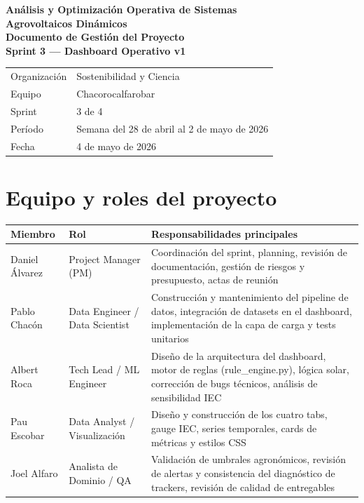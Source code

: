 \documentclass[11pt,a4paper]{article}
\begin{document}
\thispagestyle{empty}

\vspace*{2cm}
\begin{center}
  {\LARGE \textbf{Análisis y Optimización Operativa de Sistemas}}\\[0.3em]
  {\LARGE \textbf{Agrovoltaicos Dinámicos}}\\[2em]
  {\large \textbf{Documento de Gestión del Proyecto}}\\[0.5em]
  {\large \textbf{Sprint 3 — Dashboard Operativo v1}}\\[3em]

  \begin{longtable}{p{} p{}}
    Organización & Sostenibilidad y Ciencia \\
    Equipo       & Chacorocalfarobar \\
    Sprint       & 3 de 4 \\
    Período      & Semana del 28 de abril al 2 de mayo de 2026 \\
    Fecha        & 4 de mayo de 2026 \\
  \end{longtable}
\end{center}

\newpage

\tableofcontents
\newpage

\section{Equipo y roles del proyecto}

\begin{longtable}{p{} p{} p{}}
\textbf{Miembro} & \textbf{Rol} & \textbf{Responsabilidades principales} \\
\hline
Daniel Álvarez & Project Manager (PM) & Coordinación del sprint, planning, revisión de documentación, gestión de riesgos y presupuesto, actas de reunión \\
Pablo Chacón   & Data Engineer / Data Scientist & Construcción y mantenimiento del pipeline de datos, integración de datasets en el dashboard, implementación de la capa de carga y tests unitarios \\
Albert Roca    & Tech Lead / ML Engineer & Diseño de la arquitectura del dashboard, motor de reglas (rule\_engine.py), lógica solar, corrección de bugs técnicos, análisis de sensibilidad IEC \\
Pau Escobar    & Data Analyst / Visualización & Diseño y construcción de los cuatro tabs, gauge IEC, series temporales, cards de métricas y estilos CSS \\
Joel Alfaro    & Analista de Dominio / QA & Validación de umbrales agronómicos, revisión de alertas y consistencia del diagnóstico de trackers, revisión de calidad de entregables \\
\end{longtable}
\end{document}
